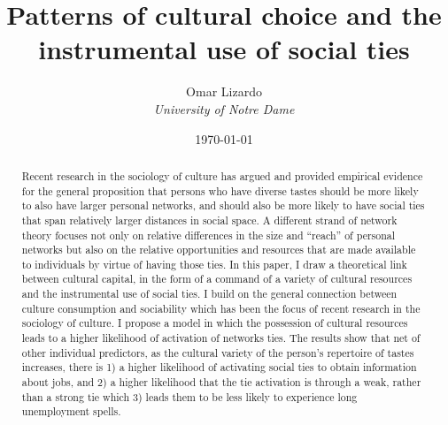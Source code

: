 \documentclass[12pt]{article}
\begin{document}
\title{Patterns of cultural choice and the instrumental use of social ties}

\author{Omar Lizardo \\ \textit{University of Notre Dame}}


\date{\today}
\maketitle

\begin{abstract}
Recent research in the sociology of culture has argued and provided empirical evidence for the general proposition that persons who have diverse tastes should be more likely to also have larger personal networks, and should also be more likely to have social ties that span relatively larger distances in social space. A different strand of network theory focuses not only on relative differences in the size and ``reach'' of personal networks but also on the relative opportunities and resources that are made available to individuals by virtue of having those ties. In this paper, I draw a theoretical link between cultural capital, in the form of a command of a variety of cultural resources and the instrumental use of social ties. I build on the general connection between culture consumption and sociability which has been the focus of recent research in the sociology of culture. I propose a model in which the possession of cultural resources leads to a higher likelihood of activation of networks ties. The results show that net of other individual predictors, as the cultural variety of the person's repertoire of tastes increases, there is 1) a higher likelihood of activating social ties to obtain information about jobs, and 2) a higher likelihood that the tie activation is through a weak, rather than a strong tie which 3) leads them to be less likely to experience long unemployment
spells. 
\end{abstract}


\doublespacing
\newpage 
\end{document}
